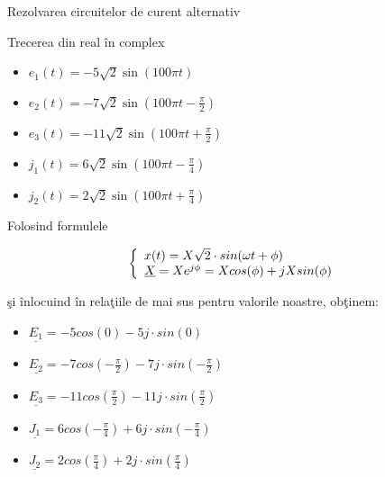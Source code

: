 \documentclass[a4paper]{article}
\begin{document}
\begin{section}{Rezolvarea circuitelor de curent alternativ}
\begin{subsection}{Trecerea din real \^ in complex\\}
\begin{multicols}{2}
\begin{large}
	\begin{itemize}
		\item $ e_1(t) = -5 \sqrt2 \sin{(100\pi t)} $
		\item $ e_2(t) = -7 \sqrt2 \sin{(100\pi t - \frac{\pi}{2})} $
		\item $ e_3(t) = -11 \sqrt2 \sin{(100\pi t + \frac{\pi}{2})} $
		
		\item $ j_1(t) = 6 \sqrt2 \sin{(100\pi t - \frac{\pi}{4})} $
		\item $ j_2(t) = 2 \sqrt2 \sin{(100\pi t + \frac{\pi}{4})} $ \\
	\end{itemize} \par
\end{large}
\end{multicols}

Folosind formulele \large 

 \begin{large} \[ \left\{ \begin{array}{ll}
$$ x(t) = X\sqrt2 \cdot sin(\omega t + \phi) $$ \\
$$ \underline{X} = X e^{j\phi}  = Xcos(\phi) + jXsin(\phi) $$
\end{array} \right. \] \end{large}
 \normalsize \c si \^ inlocuind \^ in rela\c tiile de mai sus pentru valorile noastre, ob\c tinem:

\begin{multicols}{2}
\begin{large}
	\begin{itemize}
		\item $ \underline{E_1} = -5cos(0) -5j \cdot sin(0) $
		\item $ \underline{E_2} = -7cos(-\frac{\pi}{2}) -7j \cdot sin(-\frac{\pi}{2}) $
		\item $ \underline{E_3} = -11cos(\frac{\pi}{2}) -11j \cdot sin(\frac{\pi}{2}) $
		
		\item $ \underline{J_1} = 6cos(-\frac{\pi}{4}) + 6j \cdot sin(-\frac{\pi}{4}) $
		\item $ \underline{J_2} = 2cos(\frac{\pi}{4}) + 2j \cdot sin(\frac{\pi}{4}) $ \\
	\end{itemize} \par
\end{large}
\end{multicols}


\end{subsection}
\end{section}
\end{document}
